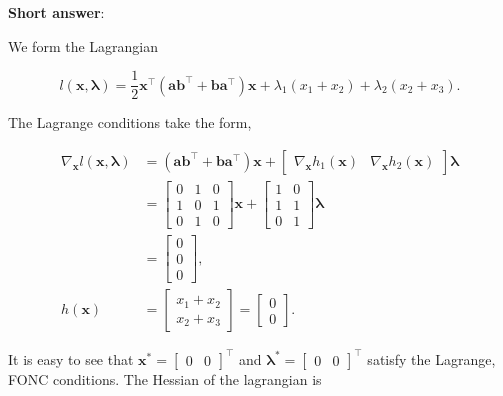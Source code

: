 \textbf{Short answer}: 

We form the Lagrangian

\[
	l(\boldsymbol{x}, \boldsymbol{\lambda} )=\frac{1}{2} \boldsymbol{x}^{\top}\left(\boldsymbol{a} \boldsymbol{b}^{\top}+\boldsymbol{b} \boldsymbol{a}^{\top}\right) \boldsymbol{x}+\lambda_{1}\left(x_{1}+x_{2}\right)+\lambda_{2}\left(x_{2}+x_{3}\right) .
\]

The Lagrange conditions take the form,

\[
	\begin{aligned}
		\nabla_{\boldsymbol{x}} l (\boldsymbol{x}, \boldsymbol{\lambda})
		& =\left(\boldsymbol{a} \boldsymbol{b}^{\top}+\boldsymbol{b} \boldsymbol{a}^{\top}\right) \boldsymbol{x}+\left[\begin{array}{ll}
			\nabla_{\boldsymbol{x}} h_{1}(\boldsymbol{x}) & \nabla_{\boldsymbol{x}} h_{2}(\boldsymbol{x})
		\end{array}\right] \boldsymbol{\lambda} \\
		& =\left[\begin{array}{lll}
			0 & 1 & 0 \\
			1 & 0 & 1 \\
			0 & 1 & 0
		\end{array}\right] \boldsymbol{x}+\left[\begin{array}{ll}
			1 & 0 \\
			1 & 1 \\
			0 & 1
		\end{array}\right] \boldsymbol{\lambda} \\
		& =\left[\begin{array}{l}
			0 \\
			0 \\
			0
		\end{array}\right], \\
		h(\boldsymbol{x})
		& =\left[\begin{array}{l}
			x_{1}+x_{2} \\
			x_{2}+x_{3}
		\end{array}\right]=\left[\begin{array}{l}
			0 \\
			0
		\end{array}\right] .
	\end{aligned}
\]

It is easy to see that \(\boldsymbol{x}^{*}=\left[\begin{array}{ll}0 & 0\end{array}\right]^{\top}\) and \(\boldsymbol{\lambda}^{*}=\left[\begin{array}{ll}0 & 0\end{array}\right]^{\top}\) satisfy the Lagrange, FONC conditions. The Hessian of the lagrangian is

